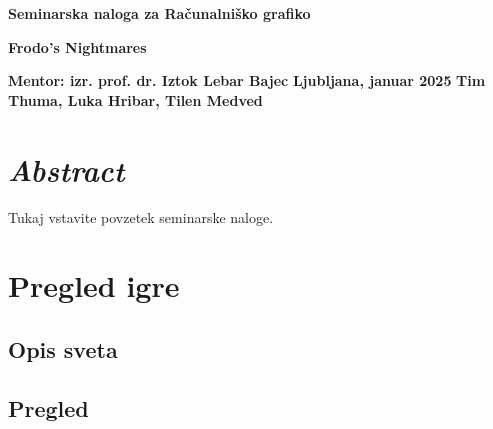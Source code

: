 \documentclass[a4paper,12pt]{article}
\begin{document}
\begin{titlepage}
    \begin{center}
        \vspace*{2cm}

        \textbf{\Huge{Seminarska naloga za Ra\v{c}unalni\v{s}ko grafiko}}

        \vspace{0.5cm}

        \textbf{\LARGE{Frodo's Nightmares}}

        \vfill

        \hspace*{-1.5cm} \textbf{Mentor: izr. prof. dr. Iztok Lebar Bajec}
        \hspace*{2.5cm} \textbf{Ljubljana, januar 2025}
        \hspace*{2cm} \textbf{Tim Thuma, Luka Hribar, Tilen Medved}
    \end{center}
\end{titlepage}

\section*{\textit{Abstract}}

Tukaj vstavite povzetek seminarske naloge.

\section{Pregled igre}

\subsection{Opis sveta}

\subsection{Pregled}
\end{document}

